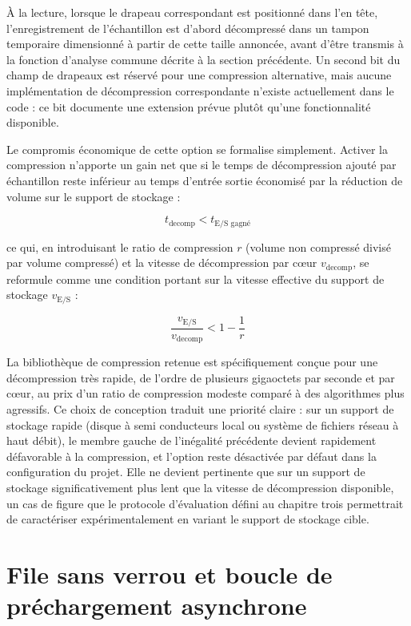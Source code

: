 \documentclass[12pt,a4paper]{report}
\begin{document}
À la lecture, lorsque le drapeau correspondant est positionné dans l'en tête, l'enregistrement de l'échantillon est d'abord décompressé dans un tampon temporaire dimensionné à partir de cette taille annoncée, avant d'être transmis à la fonction d'analyse commune décrite à la section précédente. Un second bit du champ de drapeaux est réservé pour une compression alternative, mais aucune implémentation de décompression correspondante n'existe actuellement dans le code : ce bit documente une extension prévue plutôt qu'une fonctionnalité disponible.

Le compromis économique de cette option se formalise simplement. Activer la compression n'apporte un gain net que si le temps de décompression ajouté par échantillon reste inférieur au temps d'entrée sortie économisé par la réduction de volume sur le support de stockage :

\begin{equation}
\label{eq:gain_compression}
t_{\text{decomp}} < t_{\text{E/S gagné}}
\end{equation}

ce qui, en introduisant le ratio de compression $r$ (volume non compressé divisé par volume compressé) et la vitesse de décompression par cœur $v_{\text{decomp}}$, se reformule comme une condition portant sur la vitesse effective du support de stockage $v_{\text{E/S}}$ :

\begin{equation}
\label{eq:condition_gain}
\frac{v_{\text{E/S}}}{v_{\text{decomp}}} < 1 - \frac{1}{r}
\end{equation}

La bibliothèque de compression retenue est spécifiquement conçue pour une décompression très rapide, de l'ordre de plusieurs gigaoctets par seconde et par cœur, au prix d'un ratio de compression modeste comparé à des algorithmes plus agressifs. Ce choix de conception traduit une priorité claire : sur un support de stockage rapide (disque à semi conducteurs local ou système de fichiers réseau à haut débit), le membre gauche de l'inégalité précédente devient rapidement défavorable à la compression, et l'option reste désactivée par défaut dans la configuration du projet. Elle ne devient pertinente que sur un support de stockage significativement plus lent que la vitesse de décompression disponible, un cas de figure que le protocole d'évaluation défini au chapitre trois permettrait de caractériser expérimentalement en variant le support de stockage cible.

\section{File sans verrou et boucle de préchargement asynchrone}
\label{sec:spsc_async}
\end{document}
